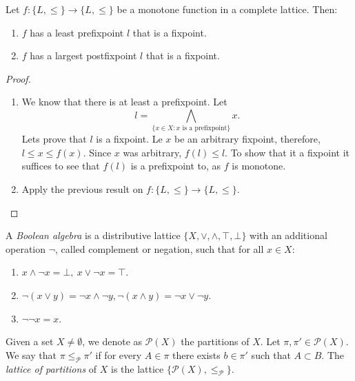 \begin{theorem}
  \label{the:fixpoint}
  Let $f:\{L,\le\}\to \{L,\le\}$ be a monotone function in a complete lattice. Then:
  \begin{enumerate}
  \item $f$ has a least prefixpoint $l$ that is a fixpoint.
  \item $f$ has a largest postfixpoint $l$ that is a fixpoint.
  \end{enumerate}
\end{theorem}
\begin{proof}\hfill  \begin{enumerate}
  \item We know that there is at least a prefixpoint. Let
    $$l = \bigwedge_{\{x\in X: x\text{ is a prefixpoint}\}} x .$$ 
    Lets prove that $l$ is a fixpoint. Le $x$ be an arbitrary fixpoint, therefore, $l \le x \le f(x)$. Since $x$ was arbitrary, $f(l) \le l$. To show that it a fixpoint it suffices to see that $f(l)$ is a prefixpoint to, as $f$ is monotone.
  \item Apply the previous result on $f:\{L,\le\}\to \{L,\le\}$.
  \end{enumerate}
\end{proof}


\begin{definition}
  A \emph{Boolean algebra} is a distributive lattice  $\{X, \vee, \wedge, \top,\bot\}$ with an additional operation $\neg$, called complement or negation, such that for all $x\in X$:
  \begin{enumerate}
  \item $ x\wedge \neg x = \bot,\ x\vee \neg x = \top $.
  \item $ \neg(x \vee y) = \neg x \wedge \neg y,  \neg(x \wedge y) = \neg x \vee \neg y$.
  \item $\neg \neg x = x$.
  \end{enumerate}
\end{definition}




\begin{definition}
Given a set $X\ne \emptyset$, we denote as $\mathcal{P}(X)$ the partitions of $X$. Let $\pi,\pi'\in \mathcal{P}(X)$. We say that $\pi\le_{\mathcal{P}}\pi'$ if for every $A\in \pi$ there exists $b\in \pi'$ such that $A\subset B$. The \emph{lattice of partitions} of $X$ is the lattice $\{\mathcal{P}(X),\le_{\mathcal{P}}\}$.
\end{definition}

